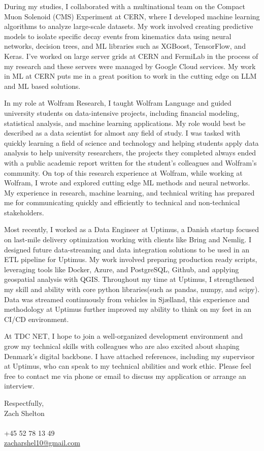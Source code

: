 \documentclass[11pt,a4]{article}
\begin{document}
During my studies, I collaborated with a multinational team on the Compact Muon Solenoid (CMS) Experiment at CERN, where I developed machine learning algorithms to analyze large-scale datasets. My work involved creating predictive models to isolate specific decay events from kinematics data using neural networks, decision trees, and ML libraries such as XGBoost, TensorFlow, and Keras. I've worked on large server grids at CERN and FermiLab in the process of my research and these servers were managed by Google Cloud services. My work in ML at CERN puts me in a great position to work in the cutting edge on LLM and ML based solutions.

In my role at Wolfram Research, I taught Wolfram Language and guided university students on data-intensive projects, including financial modeling, statistical analysis, and machine learning applications. My role would best be described as a data scientist for almost any field of study. I was tasked with quickly learning a field of science and technology and helping students apply data analysis to help university researchers, the projects they completed always ended with a public academic report written for the student's colleagues and Wolfram's community. On top of this research experience at Wolfram, while working at Wolfram, I wrote and explored cutting edge ML methods and neural networks. My experience in research, machine learning, and technical writing has prepared me for communicating quickly and efficiently to technical and non-technical stakeholders. 

Most recently, I worked as a Data Engineer at Uptimus, a Danish startup focused on last-mile delivery optimization working with clients like Bring and Nemlig. I designed future data-streaming and data integration solutions to be used in an ETL pipeline for Uptimus. My work involved preparing production ready scripts, leveraging tools like Docker, Azure, and PostgreSQL, Github, and applying geospatial analysis with QGIS. Throughout my time at Uptimus, I strengthened my skill and ability with core python libraries(such as pandas, numpy, and scipy). Data was streamed continuously from vehicles in Sjælland, this experience and methodology at Uptimus further improved my ability to think on my feet in an CI/CD environment.

At TDC NET, I hope to join a well-organized development environment and grow my technical skills with colleagues who are also excited about shaping Denmark's digital backbone. I have attached references, including my supervisor at Uptimus, who can speak to my technical abilities and work ethic. Please feel free to contact me via phone or email to discuss my application or arrange an interview.
\par

\vspace{0.5cm}
\raggedright
Respectfully, \\ Zach Shelton \\ \\ +45 52 78 13 49 \\ 
\href{mailto:zshelton1997@gmail.com}{zacharshel10@gmail.com} 
\end{document}
